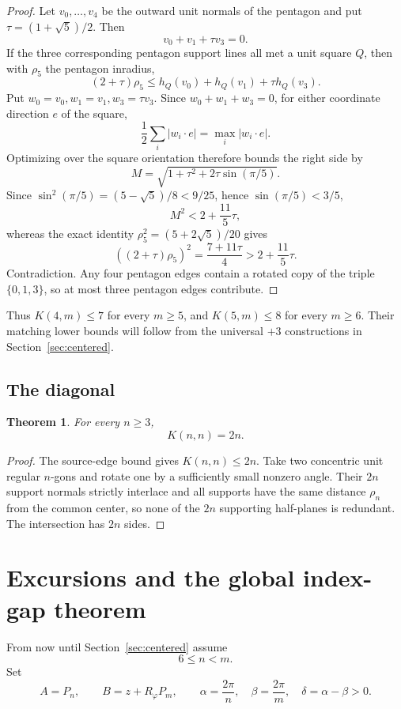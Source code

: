 \documentclass[11pt]{article}
\newtheorem{theorem}{Theorem}[section]
\theoremstyle{remark}
\begin{document}
\begin{proof}
Let $v_0,\dots,v_4$ be the outward unit normals of the pentagon and put $\tau=(1+\sqrt5)/2$. Then
\[
v_0+v_1+\tau v_3=0.
\]
If the three corresponding pentagon support lines all met a unit square $Q$, then with $\rho_5$ the pentagon inradius,
\[
(2+\tau)\rho_5\le h_Q(v_0)+h_Q(v_1)+\tau h_Q(v_3).
\]
Put $w_0=v_0,w_1=v_1,w_3=\tau v_3$. Since $w_0+w_1+w_3=0$, for either coordinate direction $e$ of the square,
\[
\frac12\sum_i|w_i\cdot e|=\max_i|w_i\cdot e|.
\]
Optimizing over the square orientation therefore bounds the right side by
\[
M=\sqrt{1+\tau^2+2\tau\sin(\pi/5)}.
\]
Since $\sin^2(\pi/5)=(5-\sqrt5)/8<9/25$, hence $\sin(\pi/5)<3/5$,
\[
M^2<2+\frac{11}{5}\tau,
\]
whereas the exact identity $\rho_5^2=(5+2\sqrt5)/20$ gives
\[
((2+\tau)\rho_5)^2=\frac{7+11\tau}{4}
>2+\frac{11}{5}\tau.
\]
Contradiction. Any four pentagon edges contain a rotated copy of the triple $\{0,1,3\}$, so at most three pentagon edges contribute.
\end{proof}

Thus $K(4,m)\le7$ for every $m\ge5$, and $K(5,m)\le8$ for every $m\ge6$. Their matching lower bounds will follow from the universal $+3$ constructions in Section~\ref{sec:centered}.

\subsection{The diagonal}

\begin{theorem}\label{thm:diagonal}
For every $n\ge3$,
\[
K(n,n)=2n.
\]
\end{theorem}

\begin{proof}
The source-edge bound gives $K(n,n)\le2n$. Take two concentric unit regular $n$-gons and rotate one by a sufficiently small nonzero angle. Their $2n$ support normals strictly interlace and all supports have the same distance $\rho_n$ from the common center, so none of the $2n$ supporting half-planes is redundant. The intersection has $2n$ sides.
\end{proof}

\section{Excursions and the global index-gap theorem}\label{sec:excursions}

From now until Section~\ref{sec:centered} assume
\[
6\le n<m.
\]
Set
\[
A=P_n,\qquad B=z+R_\varphi P_m,
\qquad
\alpha=\frac{2\pi}{n},\quad
\beta=\frac{2\pi}{m},\quad
\delta=\alpha-\beta>0.
\]
\end{document}

